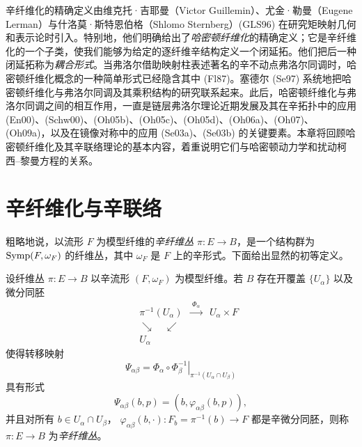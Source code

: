 辛纤维化的精确定义由维克托·吉耶曼（Victor Guillemin）、尤金·勒曼（Eugene Lerman）与什洛莫·斯特恩伯格（Shlomo Sternberg）(GLS96) 在研究矩映射几何和表示论时引入。特别地，他们明确给出了\emph{哈密顿纤维化}的精确定义；它是辛纤维化的一个子类，使我们能够为给定的逐纤维辛结构定义一个闭延拓。他们把后一种闭延拓称为\emph{耦合形式}。当弗洛尔借助映射柱表述著名的辛不动点弗洛尔同调时，哈密顿纤维化概念的一种简单形式已经隐含其中 (Fl87)。塞德尔 (Se97) 系统地把哈密顿纤维化与弗洛尔同调及其乘积结构的研究联系起来。此后，哈密顿纤维化与弗洛尔同调之间的相互作用，一直是链层弗洛尔理论近期发展及其在辛拓扑中的应用 (En00)、(Schw00)、(Oh05b)、(Oh05c)、(Oh05d)、(Oh06a)、(Oh07)、(Oh09a)，以及在镜像对称中的应用 (Se03a)、(Se03b) 的关键要素。本章将回顾哈密顿纤维化及其辛联络理论的基本内容，着重说明它们与哈密顿动力学和扰动柯西--黎曼方程的关系。

\section{辛纤维化与辛联络}
\label{sec:symplectic-fibrations-connections}

粗略地说，以流形 $F$ 为模型纤维的\emph{辛纤维丛} $\pi:E\to B$，是一个结构群为 $\operatorname{Symp}(F,\omega_F)$ 的纤维丛，其中 $\omega_F$ 是 $F$ 上的辛形式。下面给出显然的初等定义。

\begin{definition}\label{def:symplectic-fiber-bundle}
设纤维丛 $\pi:E\to B$ 以辛流形 $(F,\omega_F)$ 为模型纤维。若 $B$ 存在开覆盖 $\{U_\alpha\}$ 以及微分同胚
\begin{equation}
\begin{array}{ccccc}
&&\pi^{-1}(U_\alpha)&\xrightarrow{\ \Phi_\alpha\ }&U_\alpha\times F\\[-0.1em]
&&\searrow\quad\swarrow&&\\[-0.4em]
&&U_\alpha&&
\end{array}
\label{eq:symplectic-fibration-trivialization}
\end{equation}
使得转移映射
\[
 \Psi_{\alpha\beta}
 =\left.\Phi_\alpha\circ\Phi_\beta^{-1}
  \right|_{\pi^{-1}(U_\alpha\cap U_\beta)}
\]
具有形式
\begin{equation}
 \Psi_{\alpha\beta}(b,p)=(b,\varphi_{\alpha\beta}(b,p)),
 \label{eq:symplectic-fibration-transition}
\end{equation}
并且对所有 $b\in U_\alpha\cap U_\beta$，
$\varphi_{\alpha\beta}(b,\cdot):F_b=\pi^{-1}(b)\to F$
都是辛微分同胚，则称 $\pi:E\to B$ 为\emph{辛纤维丛}。
\end{definition}

